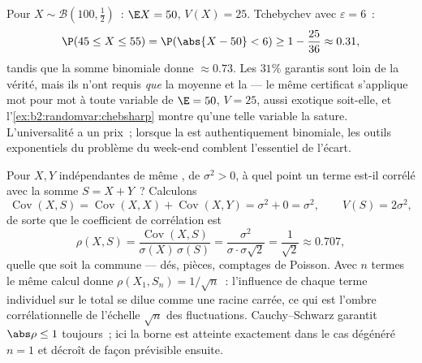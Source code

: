 \begin{example}\label{ex:b2:randomvar:hundredtosses}
Pour $X \sim \mathcal B(100, \frac12)$~: $\E X = 50$, $V(X) =
25$. Tchebychev avec $\varepsilon = 6$~:
\[
\P(45 \leq X \leq 55) = \P(\abs{X - 50} < 6)
\geq 1 - \frac{25}{36} \approx 0.31 ,
\]
tandis que la somme binomiale  donne $\approx 0.73$. Les
$31\%$ garantis sont loin de la vérité, mais ils n'ont requis
\emph{que} la moyenne et la  --- le même certificat
s'applique mot pour mot à toute variable de $\E = 50$, $V = 25$,
aussi exotique soit-elle, et l'\cref{ex:b2:randomvar:chebsharp} montre
qu'une telle variable la sature. L'universalité a un prix~;
lorsque la  est authentiquement binomiale, les outils exponentiels
du problème du week-end comblent l'essentiel de l'écart.
\end{example}

\begin{example}\label{ex:b2:randomvar:partwhole}
Pour $X, Y$ indépendantes de même , de 
$\sigma^2 > 0$, à quel point un terme est-il corrélé avec la somme
$S = X + Y$~? Calculons
\[
\operatorname{Cov}(X, S) = \operatorname{Cov}(X, X) +
\operatorname{Cov}(X, Y) = \sigma^2 + 0 = \sigma^2,
\qquad V(S) = 2\sigma^2,
\]
de sorte que le coefficient de corrélation est
\[
\rho(X, S) = \frac{\operatorname{Cov}(X,
S)}{\sigma(X)\,\sigma(S)}
= \frac{\sigma^2}{\sigma\cdot\sigma\sqrt2}
= \frac{1}{\sqrt2} \approx 0.707 ,
\]
quelle que soit la  commune --- dés, pièces, comptages de Poisson.
Avec $n$ termes le même calcul donne $\rho(X_1, S_n) =
1/\sqrt n$~: l'influence de chaque terme individuel sur le total
se dilue comme une racine carrée, ce qui est l'ombre corrélationnelle
de l'échelle $\sqrt n$ des fluctuations. Cauchy--Schwarz
garantit $\abs\rho \leq 1$ toujours~; ici la borne est atteinte
exactement dans le cas dégénéré $n = 1$ et décroît de façon prévisible
ensuite.
\end{example}

